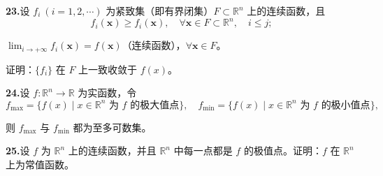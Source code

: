 \documentclass[11pt,a4paper]{article}
\begin{document}
\par{}\noindent\hypertarget{review-q23}{}\textbf{23.}\quad 设 $f_i\ (i=1,2,\cdots)$ 为紧致集（即有界闭集）$F\subset\mathbb R^n$ 上的连续函数，且
\[f_i(\boldsymbol{x})\geq f_i(\boldsymbol{x}),\quad \forall\boldsymbol{x}\in F\subset\mathbb R^n,\quad i\leq j;\]
\par\noindent $\lim_{i\to+\infty}f_i(\boldsymbol{x})=f(\boldsymbol{x})$（连续函数），$\forall\boldsymbol{x}\in F$。
\par\noindent 证明：$\{f_i\}$ 在 $F$ 上一致收敛于 $f(x)$。
\par{}\noindent\hypertarget{review-q24}{}\textbf{24.}\quad 设 $f:\mathbb R^n\to\mathbb R$ 为实函数，令
\[f_{\max}=\{f(x)\mid x\in\mathbb R^n\text{ 为 }f\text{ 的极大值点}\},\quad f_{\min}=\{f(x)\mid x\in\mathbb R^n\text{ 为 }f\text{ 的极小值点}\},\]
\par\noindent 则 $f_{\max}$ 与 $f_{\min}$ 都为至多可数集。
\par{}\noindent\hypertarget{review-q25}{}\textbf{25.}\quad 设 $f$ 为 $\mathbb R^n$ 上的连续函数，并且 $\mathbb R^n$ 中每一点都是 $f$ 的极值点。证明：$f$ 在 $\mathbb R^n$ 上为常值函数。
\end{document}
